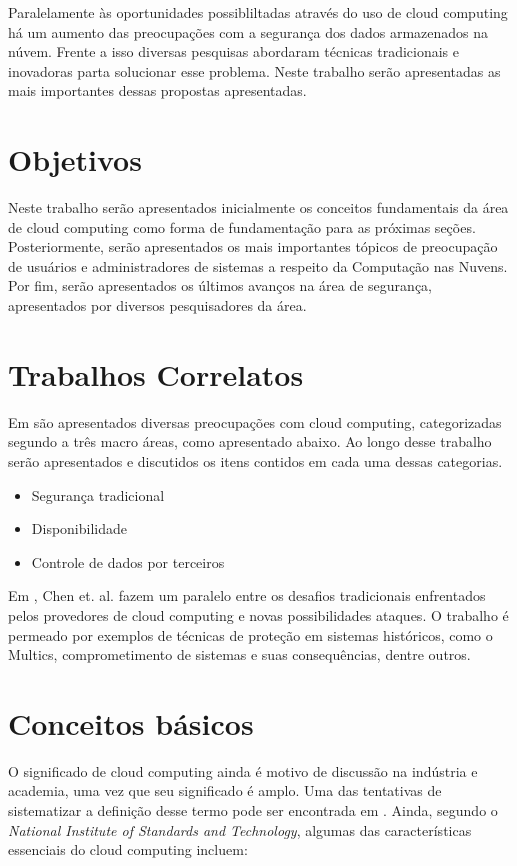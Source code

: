 \documentclass[brazil,12pt]{article}
\begin{document}
Paralelamente às oportunidades possibliltadas através do uso de cloud computing
há um aumento das preocupações com a segurança dos dados armazenados na núvem.
Frente a isso diversas pesquisas abordaram técnicas tradicionais e inovadoras
parta solucionar esse problema. Neste trabalho serão apresentadas as mais
importantes dessas propostas apresentadas.

\section{Objetivos}
Neste trabalho serão apresentados inicialmente os conceitos fundamentais da área
de cloud computing como forma de fundamentação para as próximas seções.
Posteriormente, serão apresentados os mais importantes tópicos de preocupação de
usuários e administradores de sistemas a respeito da Computação nas Nuvens.
Por fim, serão apresentados os últimos avanços na área de segurança,
apresentados por diversos pesquisadores da área.

\section{Trabalhos Correlatos}

Em \cite{controlling-data-in-cloud} são apresentados diversas preocupações com
cloud computing, categorizadas segundo a três macro áreas, como apresentado
abaixo. Ao longo desse trabalho serão apresentados e discutidos os itens contidos em cada uma dessas
categorias.
\begin{itemize}
  \item Segurança tradicional
  \item Disponibilidade
  \item Controle de dados por terceiros
\end{itemize}

Em \cite{whats-new-about-cloud-security}, Chen et. al. fazem um paralelo entre
os desafios tradicionais enfrentados pelos provedores de cloud computing e novas
possibilidades ataques. O trabalho é permeado por exemplos de técnicas de
proteção em sistemas históricos, como o Multics, comprometimento de sistemas e
suas consequências, dentre outros.


\section{Conceitos básicos}
O significado de cloud computing ainda é motivo de discussão na indústria e
academia, uma vez que seu significado é amplo. Uma das tentativas de
sistematizar a definição desse termo pode ser encontrada em \cite{above-clouds}.
Ainda, segundo o \emph{National Institute of Standards and Technology}, algumas
das características essenciais do cloud computing incluem:
\end{document}
